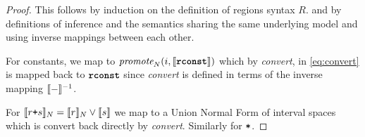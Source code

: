 \inferenceSoundness*

\begin{proof}
  This follows by induction on the definition of regions syntax
  $R$. and by definitions of inference and the semantics sharing the
  same underlying model and using inverse mappings between each other.
  
  For constants, we map to
  $\textnormal{$\textit{promote}_{N}(i,\llbracket{} {\texttt{\texttt{\textbf{rconst}}}} \rrbracket{})$}$
  which by \textit{convert}, in \eqref{eq:convert} is mapped
  back to $\texttt{\textbf{rconst}}$ since \textit{convert} is defined
  in terms of the inverse mapping $\llbracket{} {-} \rrbracket{}^{-1}$.

  For $\llbracket{} {r \texttt{+} s} \rrbracket{}_N = \llbracket{} {r} \rrbracket{}_N \vee \llbracket{} {s} \rrbracket{}$
  we map to a Union Normal Form of interval spaces which is convert
  back directly by \textit{convert}. Similarly for $\texttt{*}$.
\end{proof}